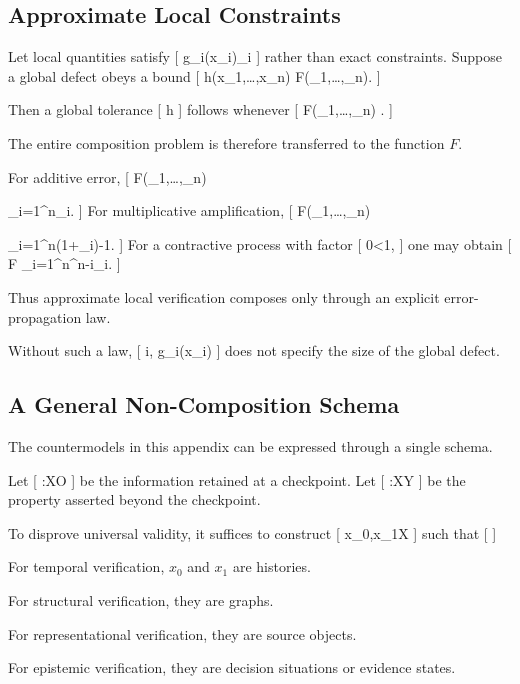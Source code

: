 \documentclass[11pt]{article}
\begin{document}
\subsection{Approximate Local Constraints}

Let local quantities satisfy
[
g_i(x_i)\leq\varepsilon_i
]
rather than exact constraints. Suppose a global defect obeys a bound
[
h(x_1,\ldots,x_n)
\leq
F(\varepsilon_1,\ldots,\varepsilon_n).
]

Then a global tolerance
[
h\leq\delta
]
follows whenever
[
F(\varepsilon_1,\ldots,\varepsilon_n)
\leq\delta.
]

The entire composition problem is therefore transferred to the function $F$.

For additive error,
[
F(\varepsilon_1,\ldots,\varepsilon_n)

\sum_{i=1}^{n}\varepsilon_i.
]
For multiplicative amplification,
[
F(\varepsilon_1,\ldots,\varepsilon_n)

\prod_{i=1}^{n}(1+\varepsilon_i)-1.
]
For a contractive process with factor
[
0\leq\lambda<1,
]
one may obtain
[
F
\leq
\sum_{i=1}^{n}\lambda^{n-i}\varepsilon_i.
]

Thus approximate local verification composes only through an explicit error-propagation law.

Without such a law,
[
\forall i,\quad
g_i(x_i)\leq\varepsilon
]
does not specify the size of the global defect.

\subsection{A General Non-Composition Schema}

The countermodels in this appendix can be expressed through a single schema.

Let
[
\pi:\mathcal X\to\mathcal O
]
be the information retained at a checkpoint. Let
[
\Phi:\mathcal X\to\mathcal Y
]
be the property asserted beyond the checkpoint.

To disprove universal validity, it suffices to construct
[
x_0,x_1\in\mathcal X
]
such that
[
]

For temporal verification, $x_0$ and $x_1$ are histories.

For structural verification, they are graphs.

For representational verification, they are source objects.

For epistemic verification, they are decision situations or evidence states.
\end{document}
